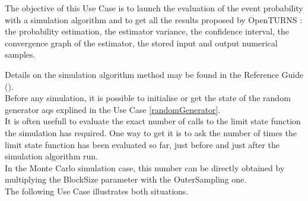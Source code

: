 \renewcommand{\filename}{docUC_ThresholdExceedance_SimulationAlgoExploitation.tex}
\renewcommand{\filetitle}{UC : Run and results exploitation  of a simulation algorithm : probability estimation, estimator variance, confidence interval, convergence graph, stored samples}

\HeaderIIILevel


\label{simuRes}



The objective of this Use Case is to launch the evaluation of the event probability with a simulation algorithm and to get all the results proposed by OpenTURNS : the probability estimation, the estimator variance, the confidence interval, the convergence graph of the estimator, the stored input and output numerical samples.





Details on the simulation algorithm method may be found in the Reference Guide ().\\

Before any simulation, it is possible to initialise or get the state of the random generator aqs explined in the Use Case \ref{randomGenerator}.\\

It is often usefull to evaluate the exact number of calls to the limit state function the simulation has required. One way to get it is to ask the number of times the limit state function has been evaluated so far, just before and just after the simulation algorithm run.\\
In the Monte Carlo simulation case, this number can be directly obtained by multiplying the BlockSize parameter with the OuterSampling one.\\
The following Use Case illustrates both situations.\\

